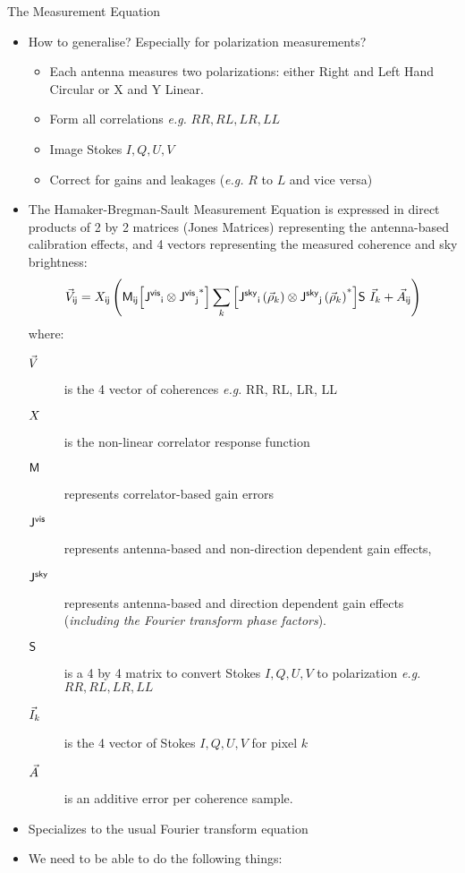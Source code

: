 \begin{slide}{The Measurement Equation}
\begin{itemize}
\item How to generalise? Especially for polarization measurements? 
\begin{itemize}
\item Each antenna measures two polarizations: either Right and Left
Hand Circular or X and Y Linear. 
\item Form all correlations {\em e.g.} $RR, RL, LR, LL$
\item Image Stokes $I,Q,U,V$
\item Correct for gains and leakages ({\em e.g.} $R$ to $L$ and vice versa)
\end{itemize}
\item The Hamaker-Bregman-Sault Measurement Equation is expressed in direct 
products of 2 by 2 matrices (Jones Matrices) representing the
antenna-based calibration effects, and 4 vectors representing the
measured coherence and sky brightness:
\begin{equation}
{\vec{V}}_{{\sf i}{\sf j}} = {{X}}_{{\sf i}{\sf j}} \left({\sf M}_{{\sf i}{\sf j}} {\left[{{\sf J^{vis}}_{{\sf i}}}\otimes{{\sf J^{vis}}_{{\sf j}}}^\ast\right]} 
\sum_k {\left[{{\sf J^{sky}}_{{\sf i}}\left({\vec{\rho}}_k\right)}\otimes{{\sf J^{sky}}_{{\sf j}}\left({\vec{\rho}}_k\right)}^\ast\right]} {\sf S} \ {\vec{I}}_k + {\vec{A}}_{{\sf i}{\sf j}} \right)
\end{equation}
where:
\begin{description}
\item[${\vec{V}}$] is the 4 vector of coherences {\em e.g.} RR, RL, LR, LL
\item[${{X}}$] is the non-linear correlator response function
\item[${\sf M}$] represents correlator-based gain errors
\item[${\sf J^{vis}}$] represents antenna-based and non-direction dependent
gain effects,
\item[${\sf J^{sky}}$] represents antenna-based and direction dependent
gain effects ({\em including the Fourier transform phase factors}).
\item[${\sf S}$] is a 4 by 4 matrix to convert Stokes $I,Q,U,V$ to 
polarization {\em e.g.} $RR,RL,LR,LL$
\item[${\vec{I}}_k$] is the 4 vector of Stokes $I,Q,U,V$ for pixel $k$
\item[${\vec{A}}$] is an additive error per coherence sample.
\end{description}
\item Specializes to the usual Fourier transform equation
\item We need to be able to do the following things:

\end{itemize}
\end{slide}
